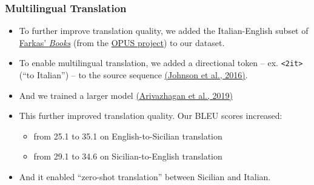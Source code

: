 \documentclass{beamer}
\begin{document}
\begin{frame}
  \frametitle{Multilingual Translation}
  \vspace{-1.0em}
  \begin{itemize}
  \item To further improve translation quality, we added the Italian-English subset of
    \href{https://farkastranslations.com/bilingual_books.php}{Farkas' \textit{Books}}
    (from the \href{http://opus.nlpl.eu/}{OPUS project}) to our dataset.
    \vspace{0.35em}
  \item To enable multilingual translation, we added a directional token -- ex. \texttt{<2it>} (``to Italian'') -- to the
    source sequence \href{https://arxiv.org/abs/1611.04558}{(Johnson et al., 2016)}.
    \vspace{0.35em}
  \item And we trained a larger model \href{https://arxiv.org/abs/1907.05019}{(Arivazhagan et al., 2019)}
    \vspace{1em}
  \item This further improved translation quality. Our BLEU scores increased:
    \begin{itemize}
    \item from 25.1 to 35.1 on English-to-Sicilian translation
    \item from 29.1 to 34.6 on Sicilian-to-English translation
    \end{itemize}
    \vspace{0.35em}
  \item And it enabled ``zero-shot translation'' between Sicilian and Italian.
  \end{itemize}
\end{frame}
\end{document}
